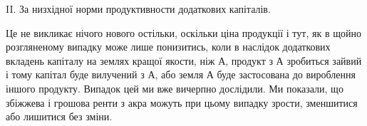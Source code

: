II. За низхідної норми продуктивности додаткових капіталів.

Це не викликає нічого нового остільки, оскільки ціна продукції і тут, як
в щойно розгляненому випадку може лише понизитись, коли в наслідок додаткових
вкладень капіталу на землях кращої якости, ніж А, продукт з А зробиться
зайвий і тому капітал буде вилучений з А, або земля А буде застосована до вироблення
іншого продукту. Випадок цей ми вже вичерпно дослідили. Ми показали,
що збіжжева і грошова ренти з акра можуть при цьому випадку зрости,
зменшитися або лишитися без зміни.